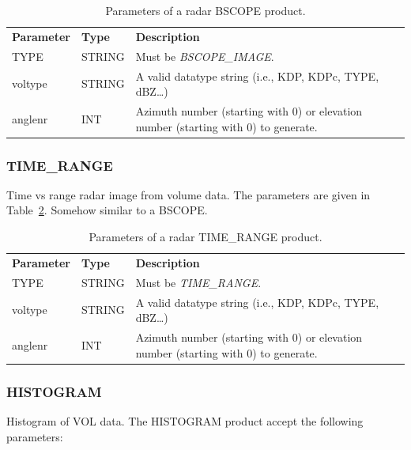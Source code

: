 \documentclass[a4paper,11pt,pdftex,twoside]{scrartcl}
\renewcommand{\bf}{\normalfont \bfseries}
\begin{document}
{{{ \begin{table}[H]
 \begin{tabularx}{\textwidth}{llX}
 \bf{Parameter}  & \bf{Type}  & \bf{Description}\\
 TYPE           & STRING     & Must be \emph{BSCOPE\_IMAGE}.\\
  voltype        & STRING     & A valid datatype string (i.e., KDP, KDPc, TYPE, dBZ\dots)\\
 anglenr        & INT        & Azimuth number (starting with 0) or elevation number (starting with 0)
                               to generate.\\
 \end{tabularx}
 \caption{Parameters of a radar BSCOPE product.}
 \label{tab_product_bscope_image}
 \end{table}

\subsubsection{TIME\_RANGE}
   \label{subsec_time_range}
Time vs range radar image from volume data. The parameters are given in Table~\ref{tab_product_time_range}. Somehow similar to a BSCOPE.

 \begin{table}[H]
 \begin{tabularx}{\textwidth}{llX}
 \bf{Parameter}  & \bf{Type}  & \bf{Description}\\
 TYPE           & STRING     & Must be \emph{TIME\_RANGE}.\\
  voltype       & STRING     & A valid datatype string (i.e., KDP, KDPc, TYPE, dBZ\dots)\\
 anglenr        & INT        & Azimuth number (starting with 0) or elevation number (starting with 0)
                               to generate.\\
 \end{tabularx}
 \caption{Parameters of a radar TIME\_RANGE product.}
 \label{tab_product_time_range}
 \end{table}

\subsubsection{HISTOGRAM}
   \label{subsec_histogram}
   Histogram of VOL data. The HISTOGRAM product accept the following parameters:

}}}
\end{document}
